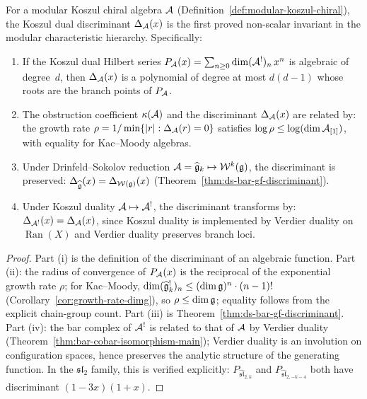 \begin{proposition}
\label{prop:discriminant-characteristic}
For a modular Koszul chiral algebra $\mathcal{A}$
\textup{(}Definition~\textup{\ref{def:modular-koszul-chiral})},
the Koszul dual discriminant $\Delta_{\mathcal{A}}(x)$ is the first proved
non-scalar invariant in the modular characteristic hierarchy.
Specifically:
\begin{enumerate}[label=\textup{(\roman*)}]
\item If the Koszul dual Hilbert series
  $P_{\mathcal{A}}(x) = \sum_{n \geq 0} \dim (\mathcal{A}^!)_n\, x^n$
  is algebraic of degree~$d$, then $\Delta_{\mathcal{A}}(x)$ is a polynomial
  of degree at most $d(d-1)$ whose roots are the branch points
  of $P_{\mathcal{A}}$.
\item The obstruction coefficient $\kappa(\mathcal{A})$ and
  the discriminant $\Delta_{\mathcal{A}}(x)$ are related by: the growth
  rate $\rho = 1/\min\{|r| : \Delta_{\mathcal{A}}(r) = 0\}$ satisfies
  $\log \rho \leq \log(\dim \mathcal{A}_{[1]})$, with equality for
  Kac--Moody algebras.
\item Under Drinfeld--Sokolov reduction $\mathcal{A} = \widehat{\mathfrak{g}}_k
  \mapsto \mathcal{W}^k(\mathfrak{g})$, the discriminant is preserved:
  $\Delta_{\widehat{\mathfrak{g}}}(x) = \Delta_{\mathcal{W}(\mathfrak{g})}(x)$
  \textup{(}Theorem~\textup{\ref{thm:ds-bar-gf-discriminant})}.
\item Under Koszul duality $\mathcal{A} \mapsto \mathcal{A}^!$, the discriminant
  transforms by: $\Delta_{\mathcal{A}^!}(x) = \Delta_{\mathcal{A}}(x)$, since
  Koszul duality is implemented by Verdier duality on
  $\operatorname{Ran}(X)$ and Verdier duality preserves branch
  loci.
\end{enumerate}
\end{proposition}

\begin{proof}
Part (i) is the definition of the discriminant of an algebraic function.
Part (ii): the radius of convergence of $P_{\mathcal{A}}(x)$ is the
reciprocal of the exponential growth rate $\rho$; for Kac--Moody,
$\dim (\widehat{\mathfrak{g}}_k^!)_n \leq (\dim \mathfrak{g})^n \cdot (n-1)!$
(Corollary~\ref{cor:growth-rate-dimg}), so $\rho \leq \dim \mathfrak{g}$;
equality follows from the explicit chain-group count.
Part (iii) is Theorem~\ref{thm:ds-bar-gf-discriminant}.
Part (iv): the bar complex of $\mathcal{A}^!$ is related to that of $\mathcal{A}$
by Verdier duality
(Theorem~\ref{thm:bar-cobar-isomorphism-main}); Verdier duality
is an involution on configuration spaces, hence preserves the
analytic structure of the generating function.  In the
$\mathfrak{sl}_2$ family, this is verified explicitly:
$P_{\widehat{\mathfrak{sl}}_{2,k}}$ and
$P_{\widehat{\mathfrak{sl}}_{2,-k-4}}$ both have discriminant
$(1-3x)(1+x)$.
\end{proof}

